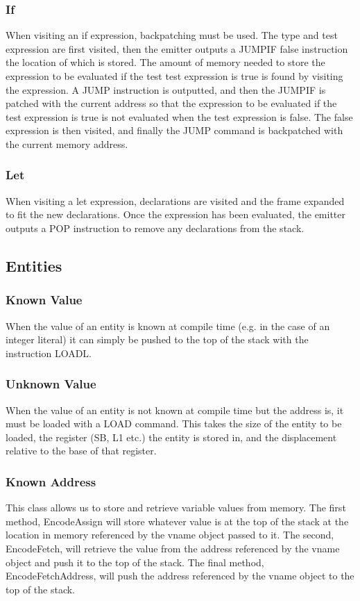 \documentclass{article}
\begin{document}
\subsubsection{If}
When visiting an if expression, backpatching must be used. The type and test expression are first visited, then the emitter outputs a JUMPIF false instruction the location of which is stored. The amount of memory needed to store the expression to be evaluated if the test test expression is true is found by visiting the expression. A JUMP instruction is outputted, and then the JUMPIF is patched with the current address so that the expression to be evaluated if the test expression is true is not evaluated when the test expression is false. The false expression is then visited, and finally the JUMP command is backpatched with the current memory address.

\subsubsection{Let}
When visiting a let expression, declarations are visited and the frame expanded to fit the new declarations. Once the expression has been evaluated, the emitter outputs a POP instruction to remove any declarations from the stack.

\subsection{Entities}
\subsubsection{Known Value}
When the value of an entity is known at compile time (e.g. in the case of an integer literal) it can simply be pushed to the top of the stack with the instruction LOADL.

\subsubsection{Unknown Value}
When the value of an entity is not known at compile time but the address is, it must be loaded with a LOAD command. This takes the size of the entity to be loaded, the register (SB, L1 etc.) the entity is stored in, and the displacement relative to the base of that register.

\subsubsection{Known Address}
This class allows us to store and retrieve variable values from memory. The first method, EncodeAssign will store whatever value is at the top of the stack at the location in memory referenced by the vname object passed to it. The second, EncodeFetch, will retrieve the value from the address referenced by the vname object and push it to the top of the stack. The final method, EncodeFetchAddress, will push the address referenced by the vname object to the top of the stack.
\end{document}
